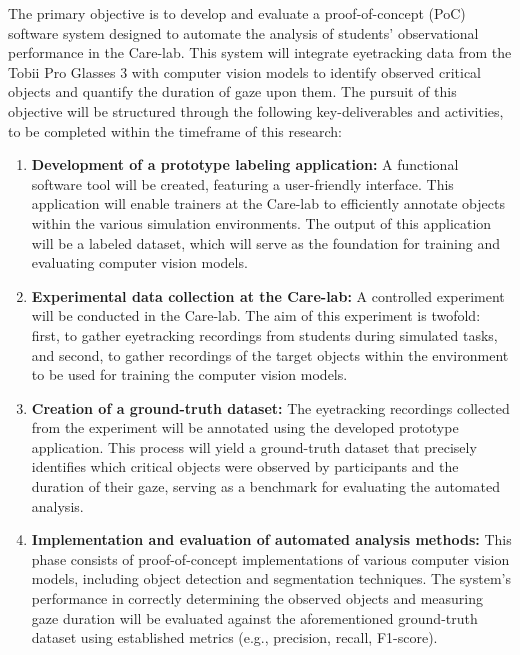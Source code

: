 \documentclass[english]{hogent-article}
\begin{document}
The primary objective is to develop and evaluate a proof-of-concept (PoC) software system designed to automate the analysis of students' observational performance in the Care-lab.
This system will integrate eyetracking data from the Tobii Pro Glasses 3 with computer vision models to identify observed critical objects and quantify the duration of gaze upon them.
The pursuit of this objective will be structured through the following key-deliverables and activities, to be completed within the timeframe of this research:
\begin{enumerate}
    \item \textbf{Development of a prototype labeling application:} A functional software tool will be created, featuring a user-friendly interface.
    This application will enable trainers at the Care-lab to efficiently annotate objects within the various simulation environments.
    The output of this application will be a labeled dataset, which will serve as the foundation for training and evaluating computer vision models.
    \item \textbf{Experimental data collection at the Care-lab:} A controlled experiment will be conducted in the Care-lab. 
    The aim of this experiment is twofold: first, to gather eyetracking recordings from students during simulated tasks, and second, to gather recordings of the target objects within the environment to be used for training the computer vision models.
    \item \textbf{Creation of a ground-truth dataset:} The eyetracking recordings collected from the experiment will be annotated using the developed prototype application.
    This process will yield a ground-truth dataset that precisely identifies which critical objects were observed by participants and the duration of their gaze, serving as a benchmark for evaluating the automated analysis.
    \item \textbf{Implementation and evaluation of automated analysis methods:} This phase consists of proof-of-concept implementations of various computer vision models, including object detection and segmentation techniques.
    The system's performance in correctly determining the observed objects and measuring gaze duration will be evaluated against the aforementioned ground-truth dataset using established metrics (e.g., precision, recall, F1-score).
\end{enumerate}

\end{document}

